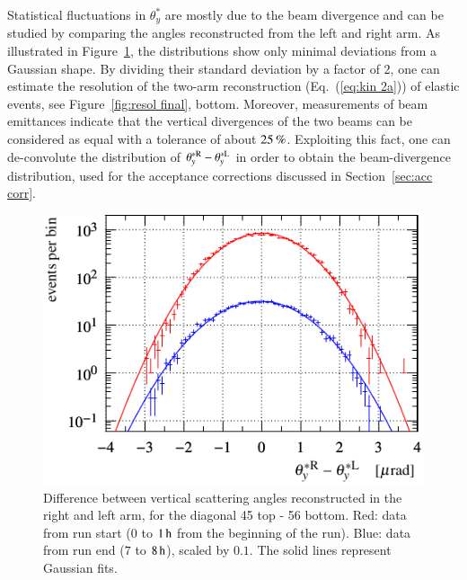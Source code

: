 Statistical fluctuations in $\theta_y^*$ are mostly due to the beam divergence and can be studied by comparing the angles reconstructed from the left and right arm. As illustrated in Figure~\ref{fig:beam div vert}, the distributions show only minimal deviations from a Gaussian shape. By dividing their standard deviation by a factor of 2, one can estimate the resolution of the two-arm reconstruction (Eq.~(\ref{eq:kin 2a})) of elastic events, see Figure~\ref{fig:resol final}, bottom. Moreover, measurements of beam emittances \cite{op-elog} indicate that the vertical divergences of the two beams can be considered as equal with a tolerance of about $25\,{\rm \%}$. Exploiting this fact, one can de-convolute the distribution of $\theta_y^{*\rm R} - \theta_y^{*\rm L}$ in order to obtain the beam-divergence distribution, used for the acceptance corrections discussed in Section~\ref{sec:acc corr}.

\begin{figure}
\begin{center}
\includegraphics{fig/beam_divergence_fits.pdf}
\caption{%
Difference between vertical scattering angles reconstructed in the right and left arm, for the diagonal 45 top - 56 bottom. Red: data from run start ($0$ to $1\,{\rm h}$ from the beginning of the run). Blue: data from run end ($7$ to $8\,{\rm h}$), scaled by $0.1$. The solid lines represent Gaussian fits.
}
\label{fig:beam div vert}
\end{center}
\end{figure}

